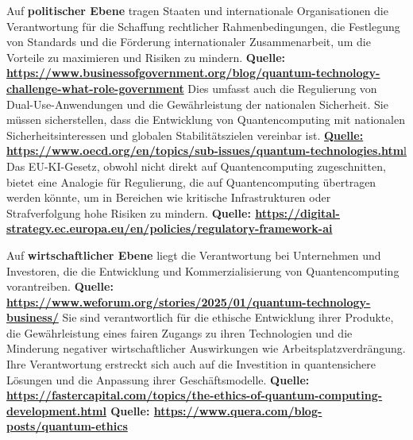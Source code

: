 {Auf \textbf{politischer Ebene} tragen Staaten und internationale Organisationen die Verantwortung für die Schaffung rechtlicher Rahmenbedingungen, die Festlegung von Standards und die Förderung internationaler Zusammenarbeit, um die Vorteile zu maximieren und Risiken zu mindern. \textbf{Quelle: \href{https://www.businessofgovernment.org/blog/quantum-technology-challenge-what-role-government}{https://www.businessofgovernment.org/blog/quantum-technology-challenge-what-role-government}} Dies umfasst auch die Regulierung von Dual-Use-Anwendungen und die Gewährleistung der nationalen Sicherheit. Sie müssen sicherstellen, dass die Entwicklung von Quantencomputing mit nationalen Sicherheitsinteressen und globalen Stabilitätszielen vereinbar ist. \href{https://www.oecd.org/en/topics/sub-issues/quantum-technologies.html}{\textbf{Quelle: https://www.oecd.org/en/topics/sub-issues/quantum-technologies.htm}l} Das EU-KI-Gesetz, obwohl nicht direkt auf Quantencomputing zugeschnitten, bietet eine Analogie für Regulierung, die auf Quantencomputing übertragen werden könnte, um in Bereichen wie kritische Infrastrukturen oder Strafverfolgung hohe Risiken zu mindern.\textbf{ Quelle: \href{https://digital-strategy.ec.europa.eu/en/policies/regulatory-framework-ai}{https://digital-strategy.ec.europa.eu/en/policies/regulatory-framework-ai}}

Auf \textbf{wirtschaftlicher Ebene} liegt die Verantwortung bei  Unternehmen und Investoren, die die Entwicklung und Kommerzialisierung von Quantencomputing vorantreiben. \textbf{Quelle: \href{https://www.weforum.org/stories/2025/01/quantum-technology-business/}{https://www.weforum.org/stories/2025/01/quantum-technology-business/}} Sie sind verantwortlich für die ethische Entwicklung ihrer Produkte, die Gewährleistung eines fairen Zugangs zu ihren Technologien und die Minderung negativer wirtschaftlicher Auswirkungen wie Arbeitsplatzverdrängung.  Ihre Verantwortung erstreckt sich auch auf die Investition in quantensichere Lösungen und die Anpassung ihrer Geschäftsmodelle.
\textbf{Quelle: \href{https://fastercapital.com/topics/the-ethics-of-quantum-computing-development.html}{https://fastercapital.com/topics/the-ethics-of-quantum-computing-development.html}
Quelle: \href{https://www.quera.com/blog-posts/quantum-ethics}{https://www.quera.com/blog-posts/quantum-ethics}}

}
